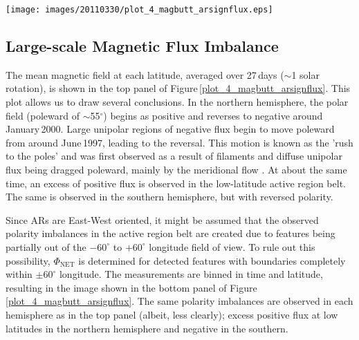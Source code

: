 \documentclass[namedreferences]{solarphysics}
\newcommand{\degr}{\ensuremath{^\circ}}
\begin{document}
\begin{article}


\begin{figure*}[!ht]
\texttt{[image: images/20110330/plot\_4\_magbutt\_arsignflux.eps]}
\caption{\emph{Top}: Magnetic butterfly diagram ($1^{\circ}$ latitude and 27\,day time binning) of mean signed magnetic field. The red and blue arrows correspond to the times of high-latitude $\Phi_{\langle B \rangle,\mathrm{NET}}$ peaks indicated in Figure\,\ref{plot_5_fluximbal_hi_lo}. \emph{Bottom}: Total detected magnetic feature $\Phi_{\mathrm{NET}}$ with binning the same as the \emph{top} panel.}
\label{plot_4_magbutt_arsignflux}
\end{figure*}


\subsection{Large-scale Magnetic Flux Imbalance}\label{subsect_imbharm}


The mean magnetic field at each latitude, averaged over 27\,days ($\sim$1 solar rotation), is shown in the top panel of Figure\,\ref{plot_4_magbutt_arsignflux}. This plot allows us to draw several conclusions. In the northern hemisphere, the polar field (poleward of $\sim$55\degr) begins as positive and reverses to negative around January\,2000. Large unipolar regions of negative flux begin to move poleward from around June\,1997, leading to the reversal. This motion is known as the 'rush to the poles' and was first observed as a result of filaments \citep{Lockyer:1931,Hyder:1965} and diffuse unipolar flux \citep{Bumba:1965} being dragged poleward, mainly by the meridional flow \citep[][and references therein]{Sheeley:2005}. At about the same time, an excess of positive flux is observed in the low-latitude active region belt. 
The same is observed in the southern hemisphere, but with reversed polarity.

Since ARs are East-West oriented, it might be assumed that the observed polarity imbalances in the active region belt are created due to features being partially out of the $-60^{\circ}$ to $+60^{\circ}$ longitude field of view. To rule out this possibility, $\Phi_{\mathrm{NET}}$ is determined for detected features with boundaries completely within $\pm60^{\circ}$ longitude. The measurements are binned in time and latitude, resulting in the image shown in the bottom panel of Figure\,\ref{plot_4_magbutt_arsignflux}. The same polarity imbalances are observed in each hemisphere as in the top panel (albeit, less clearly); excess positive flux at low latitudes in the northern hemisphere and negative in the southern.


\end{article}
\end{document}
